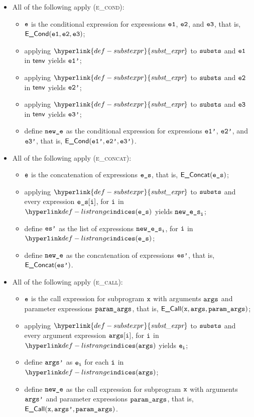 \documentclass{book}
\newcommand\substexpr[0]{\hyperlink{def-substexpr}{\textfunc{subst\_expr}}}
\begin{document}
\begin{itemize}
  \item All of the following apply (\textsc{e\_cond}):
  \begin{itemize}
    \item $\texttt{e}$ is the conditional expression for expressions $\texttt{e1}$, $\texttt{e2}$, and $\texttt{e3}$, that is, \\
          $\textsf{E\_Cond}(\texttt{e1}, \texttt{e2}, \texttt{e3})$;
    \item applying $\substexpr$ to $\texttt{substs}$ and $\texttt{e1}$ in $\textsf{tenv}$ yields $\texttt{e1'}$;
    \item applying $\substexpr$ to $\texttt{substs}$ and $\texttt{e2}$ in $\textsf{tenv}$ yields $\texttt{e2'}$;
    \item applying $\substexpr$ to $\texttt{substs}$ and $\texttt{e3}$ in $\textsf{tenv}$ yields $\texttt{e3'}$;
    \item define $\texttt{new\_e}$ as the conditional expression for expressions $\texttt{e1'}$, $\texttt{e2'}$, and $\texttt{e3'}$, that is, $\textsf{E\_Cond}(\texttt{e1'}, \texttt{e2'}, \texttt{e3'})$.
  \end{itemize}

  \item All of the following apply (\textsc{e\_concat}):
  \begin{itemize}
    \item $\texttt{e}$ is the concatenation of expressions $\texttt{e\_s}$, that is, $\textsf{E\_Concat}(\texttt{e\_s})$;
    \item applying $\substexpr$ to $\texttt{substs}$ and every expression $\texttt{e\_s}[\texttt{i}]$, for $\texttt{i}$ in \\
          $\listrange(\ves)$ yields $\texttt{new\_e\_s}_{\texttt{i}}$;
    \item define $\texttt{es'}$ as the list of expressions $\texttt{new\_e\_s}_{\texttt{i}}$, for $\texttt{i}$ in $\listrange(\ves)$;
    \item define $\texttt{new\_e}$ as the concatenation of expressions $\texttt{es'}$, that is, $\textsf{E\_Concat}(\texttt{es'})$.
  \end{itemize}

  \item All of the following apply (\textsc{e\_call}):
  \begin{itemize}
    \item $\texttt{e}$ is the call expression for subprogram $\texttt{x}$ with arguments $\texttt{args}$ and parameter expressions $\texttt{param\_args}$,
          that is, $\textsf{E\_Call}(\texttt{x}, \texttt{args}, \texttt{param\_args})$;
    \item applying $\substexpr$ to $\texttt{substs}$ and every argument expression $\texttt{args}[\texttt{i}]$, for $\texttt{i}$ in
          $\listrange(\vargs)$ yields $\texttt{e}_{\texttt{i}}$;
    \item define $\texttt{args'}$ as $\texttt{e}_{\texttt{i}}$ for each $\texttt{i}$ in $\listrange(\vargs)$;
    \item define $\texttt{new\_e}$ as the call expression for subprogram $\texttt{x}$ with arguments $\texttt{args'}$ and parameter expressions $\texttt{param\_args}$,
    that is, $\textsf{E\_Call}(\texttt{x}, \texttt{args'}, \texttt{param\_args})$.
  \end{itemize}


\end{itemize}
\end{document}
